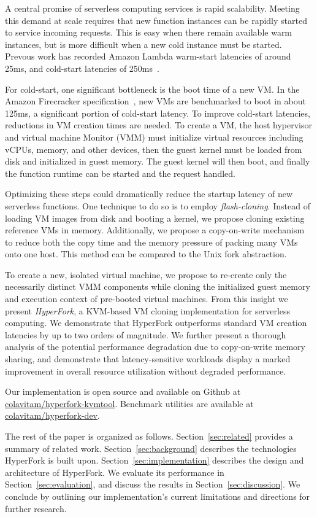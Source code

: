  A central promise of serverless computing
services is rapid scalability. Meeting this demand at scale requires that new
function instances can be rapidly started to service incoming requests. This is
easy when there remain available warm instances, but is more difficult when a
new cold instance must be started. Prevous work has recorded Amazon Lambda
warm-start latencies of around 25ms, and cold-start latencies of
250ms~\cite{peeking}.

For cold-start, one significant bottleneck is the boot time of a new VM. In the
Amazon Firecracker specification~\cite{firecracker-spec}, new VMs are
benchmarked to boot in about 125ms, a significant portion of cold-start
latency. To improve cold-start latencies, reductions in VM creation times are
needed. To create a VM, the host hypervisor and virtual machine Monitor (VMM)
must initialize virtual resources including vCPUs, memory, and other devices,
then the guest kernel must be loaded from disk and initialized in guest memory.
The guest kernel will then boot, and finally the function runtime can be
started and the request handled.

 Optimizing these steps could dramatically
reduce the startup latency of new serverless functions. One technique to do so
is to employ \emph{flash-cloning}. Instead of loading VM images from disk and
booting a kernel, we propose cloning existing reference VMs in memory.
Additionally, we propose a copy-on-write mechanism to reduce both the copy time
and the memory pressure of packing many VMs onto one host. This method can be
compared to the Unix fork abstraction.

 To create a new, isolated virtual machine, we propose to
re-create only the necessarily distinct VMM components while cloning the
initialized guest memory and execution context of pre-booted virtual machines.
From this insight we present \emph{HyperFork}, a KVM-based VM cloning
implementation for serverless computing. We demonstrate that HyperFork
outperforms standard VM creation latencies by up to two orders of magnitude. We
further present a thorough analysis of the potential performance degradation due
to copy-on-write memory sharing, and demonstrate that latency-sensitive
workloads display a marked improvement in overall resource utilization without
degraded performance.

Our implementation is open source and available on Github at
\href{https://github.com/colavitam/hyperfork-kvmtool}{colavitam/hyperfork-kvmtool}.
Benchmark utilities are available at
\href{https://github.com/colavitam/hyperfork-dev}{colavitam/hyperfork-dev}.

The rest of the paper is organized as follows. Section~\ref{sec:related}
provides a summary of related work. Section~\ref{sec:background} describes the
technologies HyperFork is built upon. Section~\ref{sec:implementation}
describes the design and architecture of HyperFork. We evaluate its performance
in Section~\ref{sec:evaluation}, and discuss the results in
Section~\ref{sec:discussion}. We conclude by outlining our implementation's
current limitations and directions for further research.
